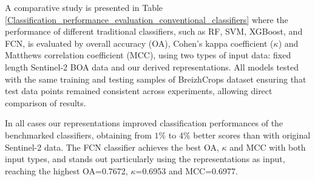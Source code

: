 \documentclass[journal,article,submit,pdftex,moreauthors]{Definitions/mdpi}
\begin{document}

A comparative study is presented in Table \ref{Classification_performance_evaluation_conventional_classifiers} where the performance of different traditional classifiers, such as RF, SVM, XGBoost, and FCN, is evaluated by overall accuracy (OA), Cohen’s kappa coefficient ($\kappa$) and Matthews correlation coefficient (MCC), using two types of input data: fixed length Sentinel-2 BOA data and our derived representations. All models tested with the same training and testing samples of BreizhCrops dataset ensuring that test data points remained consistent across experiments, allowing direct comparison of results. 

In all cases our representations improved classification performances of the benchmarked classifiers, obtaining from $1\%$ to $4\%$ better scores than with original Sentinel-2 data. The FCN classifier achieves the best OA, $\kappa$ and MCC with both input types, and stands out particularly using the representations as input, reaching the highest OA=0.7672, $\kappa$=0.6953 and MCC=0.6977.
\end{document}
